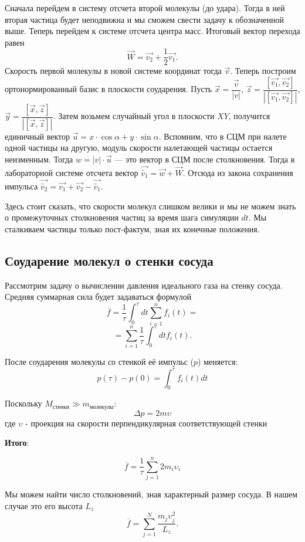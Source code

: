 \documentclass[twoside,twocolumn, 11pt]{article}
\theoremstyle{plain}
\theoremstyle{definition}
\begin{document}
Сначала перейдем в систему отсчета второй молекулы (до удара). Тогда в ней вторая частица будет неподвижна и мы сможем свести задачу к обозначенной выше. Теперь перейдем к системе отсчета центра масс. Итоговый вектор перехода равен
\begin{equation}
\vec{W} = \vec{v_2} + \dfrac{1}{2}\vec{v_1}.
\end{equation}
\indent Скорость первой молекулы в новой системе координат тогда $\vec{v}$.
Теперь построим ортонормированный базис в плоскости соударения. Пусть $\vec{x} = \dfrac{\vec{v}}{|v|}$, $\vec{z} = \dfrac{[\vec{v_1}, \vec{v_2}]}{|[\vec{v_1}, \vec{v_2}]|}$, $\vec{y} = \dfrac{[\vec{x}, \vec{z}]}{|[\vec{x}, \vec{z}]|}$. Затем возьмем случайный угол в плоскости $XY$, получится единичный вектор $\vec{u} = x \cdot \cos \alpha + y \cdot \sin \alpha$. Вспомним, что в СЦМ при налете одной частицы на другую, модуль скорости налетающей частицы остается неизменным. Тогда $w = |v| \cdot \vec{u}$ — это вектор в СЦМ после столкновения. Тогда в лабораторной системе отсчета вектор $\vec{\widetilde{v_1}} = \vec{w} + \vec{W}$. Отсюда из закона сохранения импульса $\vec{\widetilde{v_2}} = \vec{v_1} + \vec{v_2} - \vec{\widetilde{v_1}}$.

Здесь стоит сказать, что скорости молекул слишком велики и мы не можем знать о промежуточных столкновения частиц за время шага симуляции $dt$. Мы сталкиваем частицы только пост-фактум, зная их конечные положения.
\subsection{Соударение молекул о стенки сосуда}
Рассмотрим задачу о вычислении давления идеального газа на стенку сосуда. Средняя суммарная сила будет задаваться формулой
$$
\overline{f} = \dfrac{1}{\tau} \int_0^\tau dt \sum_{i=1}^n f_i(t) =$$
$$
= \sum_{i=1}^n \dfrac{1}{\tau} \int_0^\tau dt f_i(t).
$$

После соударения молекулы со стенкой её импульс ($p$) меняется:
\[p(\tau) - p(0) = \int_0^\tau f_i(t) dt \]

Поскольку $M_\text{стенки} \gg m_\text{молекулы}$:
\[\Delta p = 2m\upsilon \]где $\upsilon$ - проекция на скорости перпендикулярная соответствующей стенки

\textbf{Итого}:

\begin{equation}
\overline{f} = \dfrac{1}{\tau} \sum_{j=1}^n 2 m_i \upsilon_i
\end{equation}

Мы можем найти число столкновений, зная характерный размер сосуда. В нашем случае это его высота $L_z$
\[\overline{f} = \sum_{j = 1}^N \dfrac{m_j \upsilon_j^2}{L_z}.\]
\end{document}
